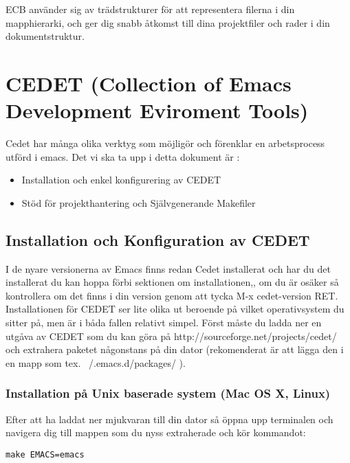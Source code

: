 \documentclass[12pt]{article} %
\begin{document}
ECB använder sig av trädstrukturer för att representera filerna i din mapphierarki, och ger dig snabb åtkomst till dina projektfiler och rader i din dokumentstruktur.





\newpage
\section{CEDET (Collection of Emacs Development Eviroment Tools)} %

Cedet har många olika verktyg som möjligör och förenklar en arbetsprocess utförd i emacs. Det vi ska ta upp i detta dokument är :
\begin{itemize}
\item Installation och enkel konfigurering av CEDET
\item Stöd för projekthantering och Självgenerande Makefiler
\end{itemize}


\subsection{Installation och Konfiguration av CEDET} %
I de nyare versionerna av Emacs finns redan Cedet installerat och har du det installerat du kan hoppa förbi sektionen om installationen,, om du är osäker så kontrollera om det finns i din version genom att tycka M-x cedet-version RET. 
Installationen för CEDET ser lite olika ut beroende på vilket operativsystem du sitter på, men är i båda fallen relativt simpel.
Först måste du ladda ner en utgåva av CEDET som du kan göra på
{http://sourceforge.net/projects/cedet/} och extrahera paketet någonstans på din dator (rekomenderat är att lägga den i en mapp som tex.  ~/.emacs.d/packages/ ).

\subsubsection{Installation på Unix baserade system (Mac OS X, Linux)}
Efter att ha laddat ner mjukvaran till din dator så öppna upp terminalen och navigera dig till mappen som du nyss extraherade och kör kommandot:
\begin{lstlisting}
make EMACS=emacs
\end{lstlisting}
\end{document}
